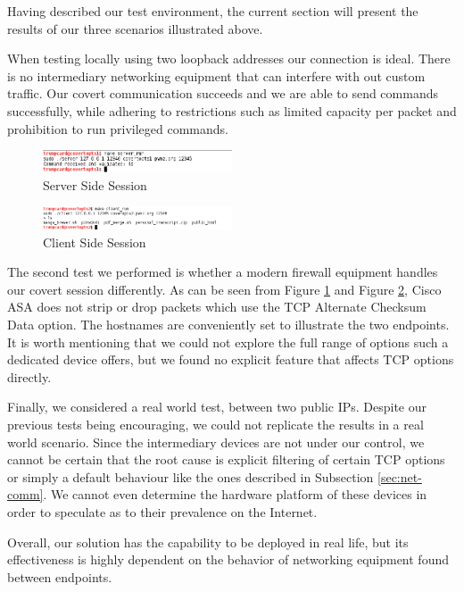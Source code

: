 
Having described our test environment, the current section will present the
results of our three scenarios illustrated above.

When testing locally using two loopback addresses our connection is ideal.
There is no intermediary networking equipment that can interfere with out
custom traffic. Our covert communication succeeds and we are able to send
commands successfully, while adhering to restrictions such as limited capacity
per packet and prohibition to run privileged commands.

\begin{figure}
  \centering
  \includegraphics[width=0.5\textwidth]{img/server-run}
  \caption{Server Side Session}
  \label{fig:server-run}
\end{figure}

\begin{figure}
  \centering
  \includegraphics[width=0.5\textwidth]{img/client-run}
  \caption{Client Side Session}
  \label{fig:client-run}
\end{figure}

The second test we performed is whether a modern firewall equipment handles
our covert session differently. As can be seen from Figure
\ref{fig:server-run} and Figure \ref{fig:client-run}, Cisco ASA does not strip
or drop packets which use the TCP Alternate Checksum Data option. The
hostnames are conveniently set to illustrate the two endpoints. It is worth
mentioning that we could not explore the full range of options such a
dedicated device offers, but we found no explicit feature that affects TCP
options directly.

Finally, we considered a real world test, between two public IPs. Despite our
previous tests being encouraging, we could not replicate the results in a real
world scenario. Since the intermediary devices are not under our control, we
cannot be certain that the root cause is explicit filtering of certain TCP
options or simply a default behaviour like the ones described in Subsection
\ref{sec:net-comm}. We cannot even determine the hardware platform of these
devices in order to speculate as to their prevalence on the Internet.

Overall, our solution has the capability to be deployed in real life, but its
effectiveness is highly dependent on the behavior of networking equipment
found between endpoints.
